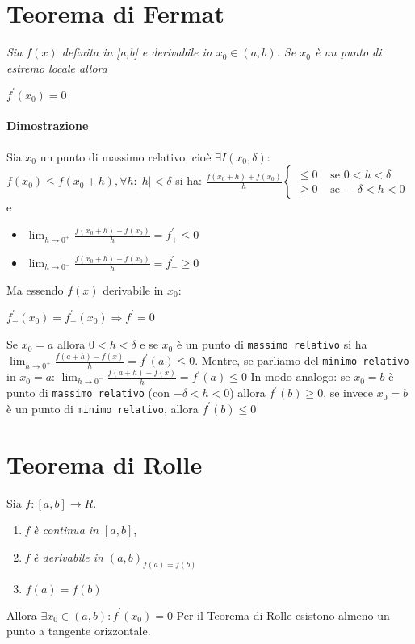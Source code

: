 \documentclass{book}
\begin{document}
\section{Teorema di Fermat}
\textit{Sia $f(x)$ definita in [a,b] e derivabile in $x_0\in(a, b)$. Se $x_0$ è
un punto di estremo locale allora}
\begin{center}
	$f^\prime (x_0)=0$
\end{center}
\paragraph{Dimostrazione} Sia $x_0$ un punto di massimo relativo, cioè $\exists
I (x_0,\delta)$: $f(x_0)\leq f(x_0+h), \forall h: |h|<\delta$ si ha:
$\frac{f(x_0+h)+f(x_0)}{h}\begin{cases}
	\leq 0 & \text{ se } 0<h<\delta\\
	\geq 0 & \text{ se } -\delta<h<0 
\end{cases}$ e 
\begin{itemize}
	\item $\lim_{h\to 0^+}\frac{f(x_0+h)-f(x_0)}{h}=f^\prime_+\leq 0$
	\item $\lim_{h\to 0^-}\frac{f(x_0+h)-f(x_0)}{h}=f^\prime_-\geq 0$
\end{itemize}
Ma essendo $f(x)$ derivabile in $x_0$:
\begin{center}
	$f^\prime_+(x_0)=f^\prime_-(x_0)\Rightarrow f^\prime=0$
\end{center}
Se $x_0=a$ allora $0<h<\delta$ e se $x_0$ è un punto di \texttt{massimo 
relativo} si ha $\lim_{h\to 0^+}\frac{f(a+h)-f(x)}{h}=f^\prime(a)\leq 0$.
Mentre, se parliamo del \texttt{minimo relativo} in $x_0=a$: 
$\lim_{h\to 0^-}\frac{f(a+h)-f(x)}{h}=f^\prime(a)\leq 0$ In modo analogo: se
$x_0=b$ è punto di \texttt{massimo relativo} (con $-\delta<h<0$) allora
$f^\prime(b)\geq 0$, se invece $x_0=b$ è un punto di \texttt{minimo relativo},
allora $f^\prime(b)\leq 0$
\section{Teorema di Rolle}
Sia $f:[a,b]\to R$.
\begin{enumerate}
	\item \textit{f è continua in $[a,b]$},
	\item \textit{f è derivabile in $(a,b)_{f(a)=f(b)}$}
	\item $f(a)=f(b)$
\end{enumerate}
Allora $\exists x_0 \in (a,b):f^\prime(x_0)=0$ Per il Teorema di Rolle esistono
almeno un punto a tangente orizzontale.
\end{document}
